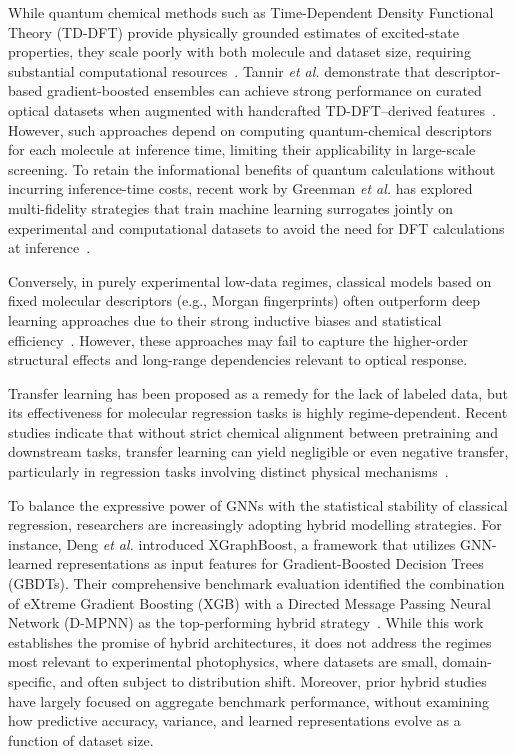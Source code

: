 While quantum chemical methods such as Time-Dependent Density Functional Theory (TD-DFT) provide physically grounded estimates of excited-state properties, they scale poorly with both molecule and dataset size, requiring substantial computational resources~\cite{dreuw2005single, casida2009time}. Tannir \textit{et al.} demonstrate that descriptor-based gradient-boosted ensembles can achieve strong performance on curated optical datasets when augmented with handcrafted TD-DFT–derived features~\cite{tannir2024predicting}. However, such approaches depend on computing quantum-chemical descriptors for each molecule at inference time, limiting their applicability in large-scale screening. To retain the informational benefits of quantum calculations without incurring inference-time costs, recent work by Greenman \textit{et al.} has explored multi-fidelity strategies that train machine learning surrogates jointly on experimental and computational datasets to avoid the need for DFT calculations at inference~\cite{greenman2022multi, ramakrishnan2015big}.

Conversely, in purely experimental low-data regimes, classical models based on fixed molecular descriptors (e.g., Morgan fingerprints) often outperform deep learning approaches due to their strong inductive biases and statistical efficiency~\cite{rogers2010extended, wu2018moleculenet, xia2023understanding}. However, these approaches may fail to capture the higher-order structural effects and long-range dependencies relevant to optical response.

Transfer learning has been proposed as a remedy for the lack of labeled data, but its effectiveness for molecular regression tasks is highly regime-dependent. Recent studies indicate that without strict chemical alignment between pretraining and downstream tasks, transfer learning can yield negligible or even negative transfer, particularly in regression tasks involving distinct physical mechanisms~\cite{hu2019strategies, sun2022does, buterez2024transfer}.

To balance the expressive power of GNNs with the statistical stability of classical regression, researchers are increasingly adopting hybrid modelling strategies. For instance, Deng \textit{et al.} introduced XGraphBoost, a framework that utilizes GNN-learned representations as input features for Gradient-Boosted Decision Trees (GBDTs). Their comprehensive benchmark evaluation identified the combination of eXtreme Gradient Boosting (XGB) with a Directed Message Passing Neural Network (D-MPNN) as the top-performing hybrid strategy~\cite{deng2021xgraphboost,chen2016xgboost,yang2019analyzing}. While this work establishes the promise of hybrid architectures, it does not address the regimes most relevant to experimental photophysics, where datasets are small, domain-specific, and often subject to distribution shift. Moreover, prior hybrid studies have largely focused on aggregate benchmark performance, without examining how predictive accuracy, variance, and learned representations evolve as a function of dataset size.

